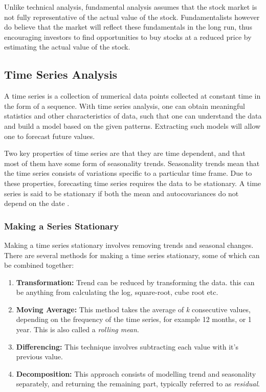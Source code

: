\documentclass{UoYCSproject}
\begin{document}
Unlike technical analysis, fundamental analysis assumes that the stock market is not fully representative of the actual value of the stock. Fundamentalists however do believe that the market will reflect these fundamentals in the long run, thus encouraging investors to find opportunities to buy stocks at a reduced price by estimating the actual value of the stock. 

\subsection{Time Series Analysis}
A time series is a collection of numerical data points collected at constant time in the form of a sequence. With time series analysis, one can obtain meaningful statistics and other characteristics of data, such that one can understand the data and build a model based on the given patterns. Extracting such models will allow one to forecast future values. 

Two key properties of time series are that they are time dependent, and that most of them have some form of seasonality trends. Seasonality trends mean that the time series consists of variations specific to a particular time frame. Due to these properties, forecasting time series requires the data to be stationary. A time series is said to be stationary if both the mean and autocovariances do not depend on the date \cite{hamilton1994time}. 

\subsubsection{Making a Series Stationary}
\label{subsec:stationary}
Making a time series stationary involves removing trends and seasonal changes. There are several methods for making a time series stationary, some of which can be combined together:
\begin{enumerate}
    \item \textbf{Transformation:} Trend can be reduced by transforming the data. this can be anything from calculating the log, square-root, cube root etc.  
    \item \textbf{Moving Average:} This method takes the average of \textit{k} consecutive values, depending on the frequency of the time series, for example 12 months, or 1 year. This is also called a \textit{rolling mean}. 
    \item \textbf{Differencing:} This technique involves subtracting each value with it's previous value.
    \item \textbf{Decomposition:} This approach consists of modelling trend and seasonality separately, and returning the remaining part, typically referred to as \textit{residual}. 
\end{enumerate}
\end{document}
